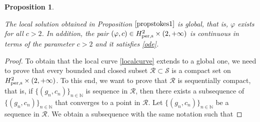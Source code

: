 \documentclass[12pt,reqno,a4paper]{amsart} %
\numberwithin{equation}{section}
\numberwithin{figure}{section}
\newtheorem{proposition}[theorem]{Proposition}
\begin{document}
\begin{proposition}\label{propstokes2}
	
	
	The local solution obtained in Proposition $\ref{propstokes1}$ is global, that is, $\varphi$ exists for all $c>2$. In addition, the pair $(\varphi, c) \in H_{\rm per,s}^2\times (2,+\infty) $ is continuous in terms of the parameter $c > 2$ and it satisfies \eqref{ode}.
\end{proposition}

\begin{proof}
	To obtain that the  local curve \eqref{localcurve} extends to a global one, we need to prove  that every bounded and closed subset $\mathcal{R}\subset\mathcal{S}$ is a compact set on $H_{\rm per,s}^{2}\times (2,+\infty)$. To this end, we want to prove that $\mathcal{R}$ is sequentially compact, that is, if $\{(g_n,c_n)\}_{n\in\mathbb{N}}$ is sequence in $\mathcal{R}$, then there exists a subsequence of $\{(g_n,c_n)\}_{n\in\mathbb{N}}$ that converges to a point in $\mathcal{R}$. Let $\{(g_n,c_n)\}_{n\in\mathbb{N}}$ be a sequence in $\mathcal{R}$. We obtain a subsequence with the same notation such that
	

\end{proof}
\end{document}
